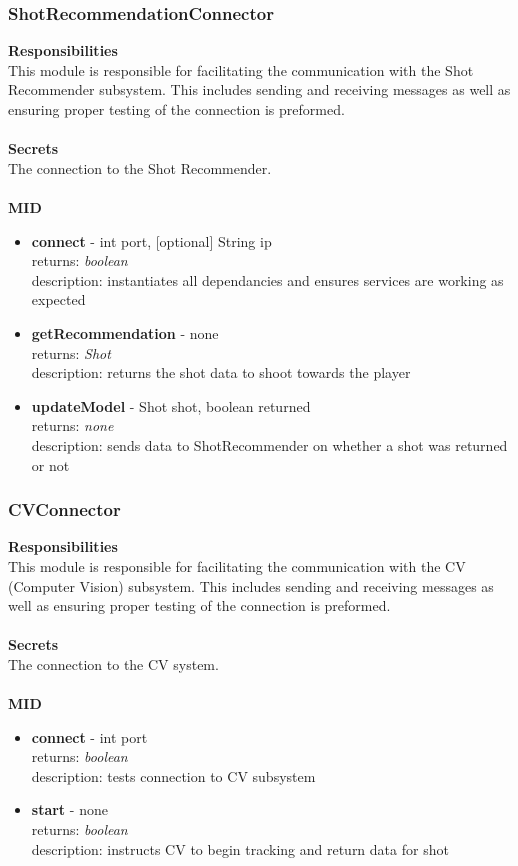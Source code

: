 \documentclass[11pt]{article}
\begin{document}
\subsubsection*{ShotRecommendationConnector}
\textbf{Responsibilities} \\
This module is responsible for facilitating the communication with the Shot Recommender subsystem. This includes sending and receiving messages as well as ensuring proper testing of the connection is preformed. \\ \\
\textbf{Secrets} \\ 
The connection to the Shot Recommender. \\ \\
\textbf{MID}
\begin{itemize}
\item \textbf{connect} - int port, [optional] String ip \\ returns: \textit{boolean} \\ description: instantiates all dependancies and ensures services are working as expected
\item \textbf{getRecommendation} - none \\ returns: \textit{Shot} \\ description: returns the shot data to shoot towards the player

\item \textbf{updateModel} - Shot shot, boolean returned \\ returns: \textit{none} \\ description: sends data to ShotRecommender on whether a shot was returned or not
\end{itemize}

\subsubsection*{CVConnector}
\textbf{Responsibilities} \\
This module is responsible for facilitating the communication with the CV (Computer Vision) subsystem. This includes sending and receiving messages as well as ensuring proper testing of the connection is preformed. \\ \\
\textbf{Secrets} \\ 
The connection to the CV system. \\ \\
\textbf{MID}
\begin{itemize}
\item \textbf{connect} - int port \\ returns: \textit{boolean} \\ description: tests connection to CV subsystem
\item \textbf{start} - none \\ returns: \textit{boolean} \\ description: instructs CV to begin tracking and return data for shot

\end{itemize}
\end{document}
